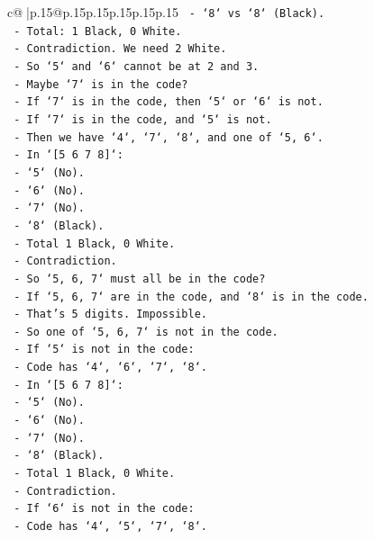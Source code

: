 \documentclass{article}
\begin{document}
{\begin{supertabular}{c@{$\;$}|p{.15\linewidth}@{}p{.15\linewidth}p{.15\linewidth}p{.15\linewidth}p{.15\linewidth}p{.15\linewidth}}
{{{\texttt{        {-} `8` vs `8` (Black).} \\
\texttt{        {-} Total: 1 Black, 0 White.} \\
\texttt{        {-} Contradiction. We need 2 White.} \\
\texttt{    {-} So `5` and `6` cannot be at 2 and 3.} \\
\texttt{    {-} Maybe `7` is in the code?} \\
\texttt{    {-} If `7` is in the code, then `5` or `6` is not.} \\
\texttt{    {-} If `7` is in the code, and `5` is not.} \\
\texttt{    {-} Then we have `4`, `7`, `8`, and one of `5, 6`.} \\
\texttt{    {-} In `{[}5 6 7 8{]}`:} \\
\texttt{        {-} `5` (No).} \\
\texttt{        {-} `6` (No).} \\
\texttt{        {-} `7` (No).} \\
\texttt{        {-} `8` (Black).} \\
\texttt{        {-} Total 1 Black, 0 White.} \\
\texttt{        {-} Contradiction.} \\
\texttt{    {-} So `5, 6, 7` must all be in the code?} \\
\texttt{    {-} If `5, 6, 7` are in the code, and `8` is in the code.} \\
\texttt{    {-} That's 5 digits. Impossible.} \\
\texttt{    {-} So one of `5, 6, 7` is not in the code.} \\
\texttt{    {-} If `5` is not in the code:} \\
\texttt{        {-} Code has `4`, `6`, `7`, `8`.} \\
\texttt{        {-} In `{[}5 6 7 8{]}`:} \\
\texttt{            {-} `5` (No).} \\
\texttt{            {-} `6` (No).} \\
\texttt{            {-} `7` (No).} \\
\texttt{            {-} `8` (Black).} \\
\texttt{            {-} Total 1 Black, 0 White.} \\
\texttt{            {-} Contradiction.} \\
\texttt{    {-} If `6` is not in the code:} \\
\texttt{        {-} Code has `4`, `5`, `7`, `8`.} \\
}}}
\end{supertabular}}
\end{document}
